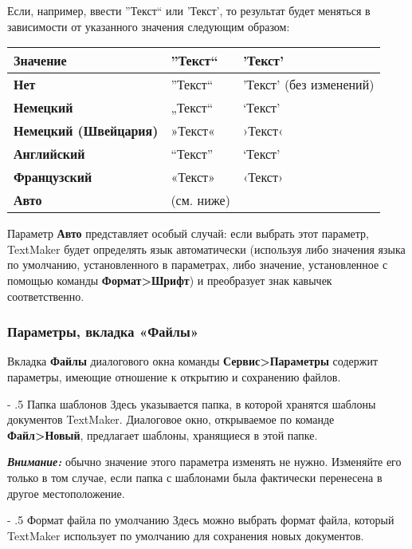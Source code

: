 ﻿\documentclass[a4paper,10pt]{article}
\makeatletter
\renewcommand\paragraph{%
   \@startsection{paragraph}{4}{0mm}%
      {-\baselineskip}%
      {.5\baselineskip}%
      {\normalfont\normalsize\bfseries}}
\makeatother
\begin{document}
 Если, например, ввести ''Текст`` или  'Текст', то результат будет меняться в зависимости от указанного значения следующим образом:
 
 \begin{tabular}{  m{6cm}  m{4cm}  m{6cm} }  
 \textbf{Значение} & \textbf{''Текст``} & \textbf{'Текст'}\\ 
 \hline
  \textbf{Нет} & ''Текст`` & 'Текст' (без изменений)\\
  \textbf{Немецкий} & „Текст“ & ‘Текст’\\ 
\textbf{Немецкий (Швейцария)} & »Текст« & ›Текст‹\\
\textbf{Английский} & “Текст” & ‘Текст’\\
\textbf{Французский} & «Текст» & ‹Текст›\\
\textbf{Авто} & (см. ниже) & \\
\end{tabular} 
 
Параметр \textbf{Авто} представляет особый случай: если выбрать этот параметр, TextMaker будет определять язык автоматически (используя либо значения языка по умолчанию, установленного в параметрах, либо значение, установленное с помощью команды \textbf{Формат>Шрифт}) и преобразует знак кавычек соответственно.
 
 \subsubsection{Параметры, вкладка «Файлы»}
 Вкладка \textbf{Файлы} диалогового окна команды \textbf{Сервис>Параметры} содержит параметры, имеющие отношение к открытию и сохранению файлов.
 
 \paragraph{Папка шаблонов}
 Здесь указывается папка, в которой хранятся шаблоны документов TextMaker. Диалоговое окно, открываемое по команде \textbf{Файл>Новый}, предлагает шаблоны, хранящиеся в этой папке.
 
 \begin{mdframed}[backgroundcolor=blue!10]
\textbf{\textit{Внимание:}} обычно значение этого параметра изменять не нужно. Изменяйте его только в том случае, если папка с шаблонами была фактически перенесена в другое местоположение.
\end{mdframed}
 
 \paragraph{Формат файла по умолчанию}
 Здесь можно выбрать формат файла, который TextMaker использует по умолчанию для сохранения новых документов.
 
\end{document}
